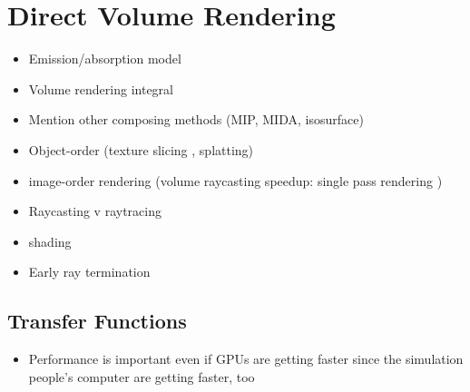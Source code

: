 \section{Direct Volume Rendering}
\begin{itemize}
    \item Emission/absorption model \cite{sabella1988rendering}
    \item Volume rendering integral \cite{max1995optical}
    \item Mention other composing methods (MIP, MIDA, isosurface)
    \item Object-order (texture slicing \cite{westermann1998efficiently}, splatting\cite{westover1990footprint})
    \item image-order rendering (volume raycasting \cite{levoy1988display, drebin1988volume,sabella1988rendering} speedup: \cite{kruger2003acceleration} single pass rendering \cite{hadwiger2005real, stegmaier2005simple})
    \item Raycasting v raytracing
    \item shading \cite{phong1975illumination}
    \item Early ray termination \cite{levoy1990efficient}
\end{itemize}

\subsection{Transfer Functions}



\begin{itemize}
\item Performance is important even if GPUs are getting faster since the simulation people's computer are getting faster, too
\end{itemize}
